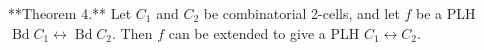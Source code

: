 **Theorem 4.** Let $C_1$ and $C_2$ be combinatorial 2-cells, and let $f$ be a PLH $\operatorname{Bd} C_1 \leftrightarrow \operatorname{Bd} C_2$. Then $f$ can be extended to give a PLH $C_1 \leftrightarrow C_2$.
